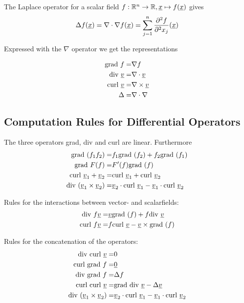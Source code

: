 The Laplace operator for a scalar field $f : \mathbb{R}^n \to \mathbb{R}, \underline{x} \mapsto f(\underline{x})$ gives
\[
	\Delta f(\underline{x})  = \nabla \cdot \nabla f(\underline{x}) = \sum_{j=1}^n \frac{\partial^2 f}{\partial^2 x_j}(\underline{x})
\]


Expressed with the $\nabla$ operator we get the representations

 \begin{align*}
	\text{grad } f = & \nabla f \\
	\text{div } \underline{v} = & \nabla \cdot \underline{v}\\
	\text{curl } \underline{v} = &  \nabla \times \underline{v} \\
	\Delta =& \nabla \cdot \nabla \\
\end{align*}


\subsection*{Computation Rules for Differential Operators}
The three operators grad, div and curl are linear. 
Furthermore
\begin{align*}
	\text{grad }(f_1 f_2) = & f_1 \text{grad }( f_2) + f_2 \text{grad }(f_1 )\\
	\text{grad }F(f) = & F'(f) \text{grad }(f) \\
	\text{curl } \underline{v}_1 + \underline{v}_2 = &  \text{curl } \underline{v}_1 + \text{curl } \underline{v}_2\\
	\text{div } (\underline{v}_1 \times \underline{v}_2) = & \underline{v}_2 \cdot \text{curl }\underline{v}_1 - \underline{v}_1 \cdot \text{curl }\underline{v}_2 \\
\end{align*}

Rules for the interactions between vector- and scalarfields:
\begin{align*}
	\text{div } f\underline{v} = &  \underline{v} \text{grad }( f) + f \text{div } \underline{v}\\
	\text{curl } f \underline{v} = &  f \text{curl }\underline{v}  -  \underline{v} \times \text{grad }(f)\\
\end{align*}

Rules for the concatenation of the operators:
\begin{align*}
	\text{div }\text{curl } \underline{v} = &  0 \\
	\text{curl }\text{grad } f = &  \underline{0} \\
	\text{div }\text{grad } f = & \Delta f \\
	\text{curl }\text{curl } \underline{v} = & \text{grad }  \text{div } \underline{v} - \Delta \underline{v} \\
	\text{div } (\underline{v}_1 \times \underline{v}_2) = & \underline{v}_2 \cdot \text{curl }\underline{v}_1 - \underline{v}_1 \cdot \text{curl }\underline{v}_2 \\
\end{align*}






















